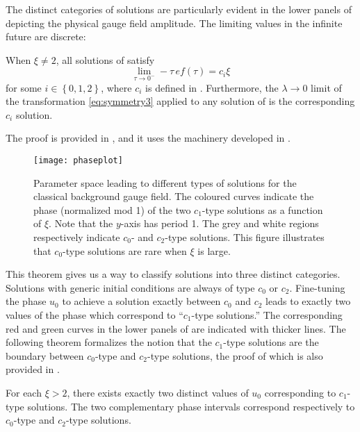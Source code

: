 The distinct categories of solutions are particularly evident in the lower panels of  depicting the physical gauge field amplitude. The limiting values in the infinite future are discrete: 
\begin{thm}
\label{thm:bg-future}When $\xi\neq2$, all solutions of  satisfy
\[
\lim_{\tau\to0^{-}}-\tau\,ef(\tau)=c_{i}\xi
\]
for some $i\in\left\{ 0,1,2\right\} $, where $c_{i}$ is defined in . Furthermore, the $\lambda\to0$ limit of the transformation \eqref{eq:symmetry3} applied to any solution of  is the corresponding $c_{i}$ solution. 
\end{thm}

The proof is provided in , and it uses the machinery developed in .

\begin{figure}[t]
\begin{centering}
\texttt{[image: phaseplot]} 
\par\end{centering}
\caption{\label{fig:u0-of-xi}Parameter space leading to different types of solutions for the classical background gauge field. The coloured curves indicate the phase (normalized mod 1) of the two $c_{1}$\protect\nobreakdash-type solutions as a function of $\xi$. Note that the $y$-axis has period 1. The grey and white regions respectively indicate $c_{0}$- and $c_{2}$\protect\nobreakdash-type solutions. This figure illustrates that $c_{0}$\protect\nobreakdash-type solutions are rare when $\xi$ is large. }
\end{figure}
This theorem gives us a way to classify solutions into three distinct categories. Solutions with generic initial conditions are always of type $c_{0}$ or $c_{2}$. Fine-tuning the phase $u_{0}$ to achieve a solution exactly between $c_{0}$ and $c_{2}$ leads to exactly two values of the phase which correspond to ``$c_{1}$\nobreakdash-type solutions.'' The corresponding red and green curves in the lower panels of  are indicated with thicker lines. The following theorem formalizes the notion that the $c_{1}$\nobreakdash-type solutions are the boundary between $c_{0}$\nobreakdash-type and $c_{2}$\nobreakdash-type solutions, the proof of which is also provided in .
\begin{thm}
\label{thm:phase-intervals}For each $\xi>2$, there exists exactly two distinct values of $u_{0}$ corresponding to $c_{1}$\nobreakdash-type solutions. The two complementary phase intervals correspond respectively to $c_{0}$\nobreakdash-type and $c_{2}$\nobreakdash-type solutions. 
\end{thm}

